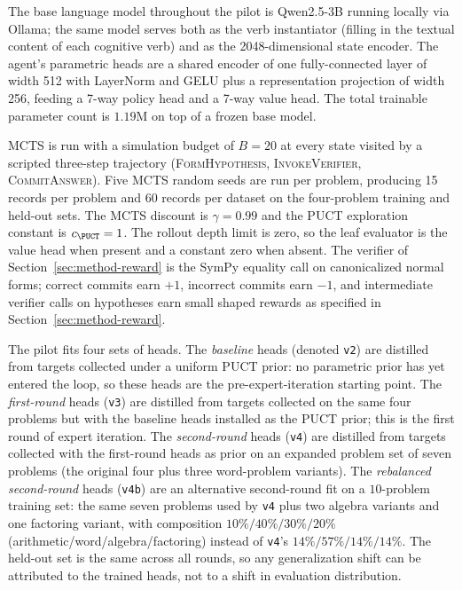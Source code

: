 The base language model throughout the pilot is Qwen2.5-3B running
locally via Ollama; the same model serves both as the verb instantiator
(filling in the textual content of each cognitive verb) and as the
2048-dimensional state encoder. The agent's parametric heads are a
shared encoder of one fully-connected layer of width 512 with
LayerNorm and GELU plus a representation projection of width 256,
feeding a 7-way policy head and a 7-way value head. The total trainable
parameter count is $1.19\mathrm{M}$ on top of a frozen base model.

MCTS is run with a simulation budget of $B = 20$ at every state visited
by a scripted three-step trajectory (\textsc{FormHypothesis},
\textsc{InvokeVerifier}, \textsc{CommitAnswer}). Five MCTS random seeds
are run per problem, producing 15 records per problem and 60 records
per dataset on the four-problem training and held-out sets. The MCTS
discount is $\gamma = 0.99$ and the PUCT exploration constant is
$c_{\PUCT} = 1$. The rollout depth limit is zero, so the leaf
evaluator is the value head when present and a constant zero when
absent. The verifier of Section~\ref{sec:method-reward} is the SymPy
equality call on canonicalized normal forms; correct commits earn
$+1$, incorrect commits earn $-1$, and intermediate verifier calls
on hypotheses earn small shaped rewards as specified in
Section~\ref{sec:method-reward}.

The pilot fits four sets of heads. The \emph{baseline} heads
(denoted \texttt{v2}) are distilled from targets collected under a
uniform PUCT prior: no parametric prior has yet entered the loop, so
these heads are the pre-expert-iteration starting point. The
\emph{first-round} heads (\texttt{v3}) are distilled from targets
collected on the same four problems but with the baseline heads
installed as the PUCT prior; this is the first round of expert
iteration. The \emph{second-round} heads (\texttt{v4}) are distilled
from targets collected with the first-round heads as prior on an
expanded problem set of seven problems (the original four plus three
word-problem variants). The \emph{rebalanced second-round} heads
(\texttt{v4b}) are an alternative second-round fit on a $10$-problem
training set: the same seven problems used by \texttt{v4} plus two
algebra variants and one factoring variant, with composition
$10\%/40\%/30\%/20\%$ (arithmetic/word/algebra/factoring) instead of
\texttt{v4}'s $14\%/57\%/14\%/14\%$. The held-out set is the same
across all rounds, so any generalization shift can be attributed to
the trained heads, not to a shift in evaluation distribution.

